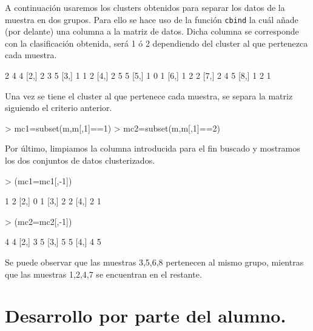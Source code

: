 \documentclass [a4paper] {article}
\begin{document}
\bigskip
A continuación usaremos los clusters obtenidos para separar los datos de la muestra en dos grupos. Para ello
se hace uso de la función \texttt{cbind} la cuál añade (por delante) una columna a la matriz de datos. Dicha
columna se corresponde con la clasificación obtenida, será 1 ó 2 dependiendo del cluster al que pertenezca
cada muestra.
\begin{Schunk}
\begin{Soutput}
     [,1] [,2] [,3]
[1,]    2    4    4
[2,]    2    3    5
[3,]    1    1    2
[4,]    2    5    5
[5,]    1    0    1
[6,]    1    2    2
[7,]    2    4    5
[8,]    1    2    1
\end{Soutput}
\end{Schunk}

\bigskip
Una vez se tiene el cluster al que pertenece cada muestra, se separa la matriz siguiendo el criterio anterior.
\begin{Schunk}
\begin{Sinput}
> mc1=subset(m,m[,1]==1)
> mc2=subset(m,m[,1]==2)
\end{Sinput}
\end{Schunk}

\bigskip
Por último, limpiamos la columna introducida para el fin buscado y mostramos los dos conjuntos de datos
clusterizados.
\begin{Schunk}
\begin{Sinput}
> (mc1=mc1[,-1])
\end{Sinput}
\begin{Soutput}
     [,1] [,2]
[1,]    1    2
[2,]    0    1
[3,]    2    2
[4,]    2    1
\end{Soutput}
\begin{Sinput}
> (mc2=mc2[,-1])
\end{Sinput}
\begin{Soutput}
     [,1] [,2]
[1,]    4    4
[2,]    3    5
[3,]    5    5
[4,]    4    5
\end{Soutput}
\end{Schunk}

\bigskip
Se puede observar que las muestras 3,5,6,8 pertenecen al mismo grupo, mientras que las muestras 1,2,4,7 
se encuentran en el restante.

\section{Desarrollo por parte del alumno.}
\end{document}
